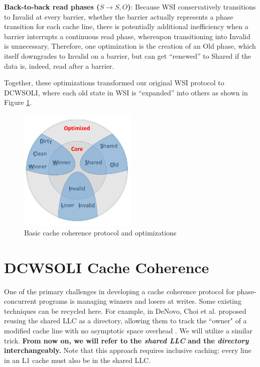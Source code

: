 \documentclass{article}
\begin{document}
\textbf{Back-to-back read phases ($S \rightarrow S, O$)}:
Because WSI conservatively transitions to Invalid at every barrier, whether the barrier actually represents a phase transition for each cache line, there is potentially additional inefficiency when a barrier interrupts a continuous read phase, whereupon transitioning into Invalid is unnecessary. Therefore, one optimization is the creation of an Old phase, which itself downgrades to Invalid on a barrier, but can get ``renewed'' to Shared if the data is, indeed, read after a barrier.

Together, these optimizations transformed our original WSI protocol to DCWSOLI, where each old state in WSI is ``expanded'' into others as shown in Figure \ref{wsi-to-dcwsoli}.

\begin{figure}[H]
\centering
\includegraphics[width=0.5\textwidth]{img/posterfig2.png}
\caption{Basic cache coherence protocol and optimizations}
\label{wsi-to-dcwsoli}
\end{figure}

\section{DCWSOLI Cache Coherence}
One of the primary challenges in developing a cache coherence protocol for phase-concurrent programs is managing winners and losers at writes. Some existing techniques can be recycled here. For example, in DeNovo, Choi et al. proposed reusing the shared LLC as a directory, allowing them to track the ``owner" of a modified cache line with no asymptotic space overhead \cite{choi2010denovo}. We will utilize a similar trick. \textbf{From now on, we will refer to the \textit{shared LLC} and the \textit{directory} interchangeably.} Note that this approach requires inclusive caching: every line in an L1 cache must also be in the shared LLC.
\end{document}
